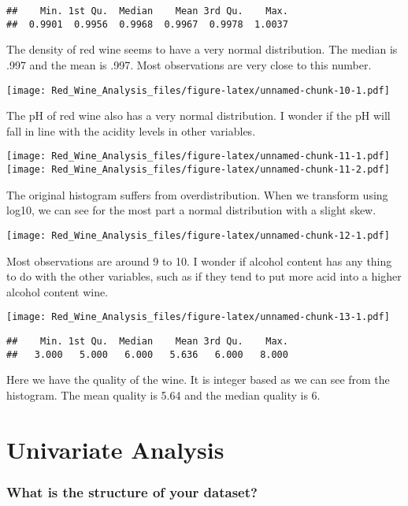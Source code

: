 \documentclass[]{article}
\begin{document}
\begin{verbatim}
##    Min. 1st Qu.  Median    Mean 3rd Qu.    Max. 
##  0.9901  0.9956  0.9968  0.9967  0.9978  1.0037
\end{verbatim}

The density of red wine seems to have a very normal distribution. The
median is .997 and the mean is .997. Most observations are very close to
this number.

\texttt{[image: Red\_Wine\_Analysis\_files/figure-latex/unnamed-chunk-10-1.pdf]}

The pH of red wine also has a very normal distribution. I wonder if the
pH will fall in line with the acidity levels in other variables.

\texttt{[image: Red\_Wine\_Analysis\_files/figure-latex/unnamed-chunk-11-1.pdf]}
\texttt{[image: Red\_Wine\_Analysis\_files/figure-latex/unnamed-chunk-11-2.pdf]}

The original histogram suffers from overdistribution. When we transform
using log10, we can see for the most part a normal distribution with a
slight skew.

\texttt{[image: Red\_Wine\_Analysis\_files/figure-latex/unnamed-chunk-12-1.pdf]}

Most observations are around 9 to 10. I wonder if alcohol content has
any thing to do with the other variables, such as if they tend to put
more acid into a higher alcohol content wine.

\texttt{[image: Red\_Wine\_Analysis\_files/figure-latex/unnamed-chunk-13-1.pdf]}

\begin{verbatim}
##    Min. 1st Qu.  Median    Mean 3rd Qu.    Max. 
##   3.000   5.000   6.000   5.636   6.000   8.000
\end{verbatim}

Here we have the quality of the wine. It is integer based as we can see
from the histogram. The mean quality is 5.64 and the median quality is
6.

\hypertarget{univariate-analysis}{%
\section{Univariate Analysis}\label{univariate-analysis}}

\hypertarget{what-is-the-structure-of-your-dataset}{%
\subsubsection{What is the structure of your
dataset?}\label{what-is-the-structure-of-your-dataset}}
\end{document}
